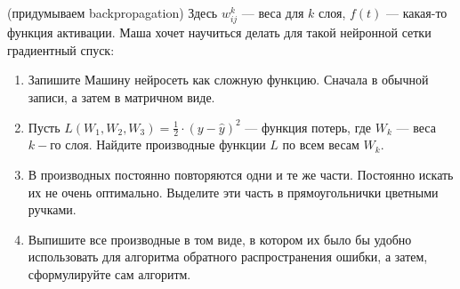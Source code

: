 \begin{problem}{(придумываем backpropagation)}
Здесь $w_{ij}^k$ --- веса для $k$ слоя, $f(t)$ --- какая-то функция активации. Маша хочет научиться делать для такой нейронной сетки градиентный спуск: 

\begin{enumerate}
	\item  Запишите Машину нейросеть как сложную функцию. Сначала в обычной записи, а затем в матричном виде. 
	
	\item  Пусть $L(W_1, W_2, W_3) = \frac{1}{2} \cdot (y - \hat y)^2$ --- функция потерь, где $W_k$ --- веса $k-$го слоя.  Найдите производные функции $L$ по всем весам $W_k$.
	
	\item В производных постоянно повторяются одни и те же части. Постоянно искать их не очень оптимально. Выделите эти часть в прямоугольнички цветными ручками. 
	
	\item Выпишите все производные в том виде, в котором их было бы удобно использовать для алгоритма обратного распространения ошибки, а затем, сформулируйте сам алгоритм.
\end{enumerate}
\end{problem}



